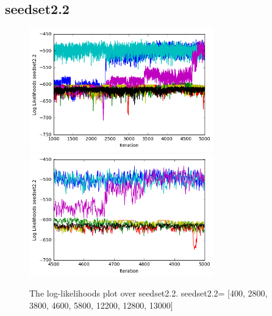 \documentclass[11pt]{article}
\begin{document}
\begin{spacing}{1.6}
\subsection{seedset2.2}
\begin{minipage}{1.0\textwidth}
\begin{figure}[H]
\includegraphics[width = 80mm]{figure7.png}
\includegraphics[width = 80mm]{figure8.png}
\caption{The log-likelihoods plot over seedset2.2.  seedset2.2= [400, 2800, 3800, 4600, 5800, 12200, 12800, 13000]}\scriptsize
\end{figure}
\end{minipage}\\



\end{spacing}
\end{document}
